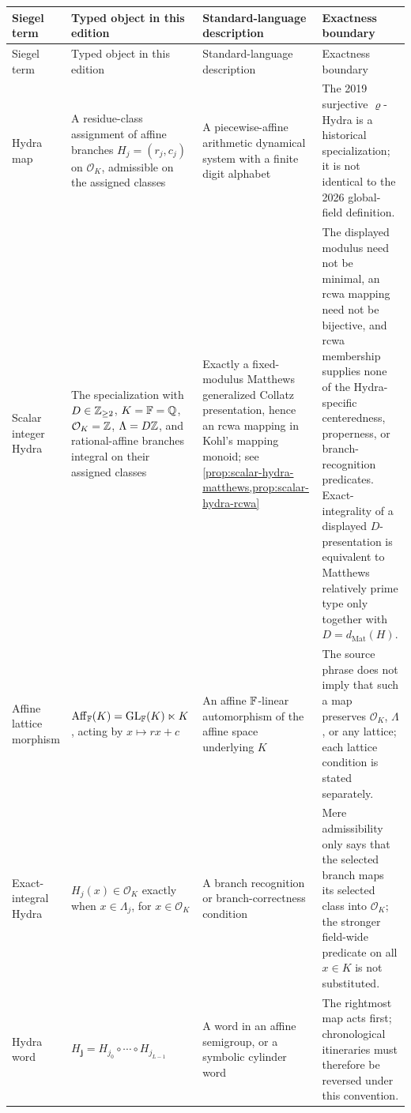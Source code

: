 \begingroup\small
\setlength{\tabcolsep}{3pt}
\begin{longtable}{@{}p{}p{}p{}p{}@{}}
\toprule
Siegel term & Typed object in this edition & Standard-language description & Exactness boundary\\
\midrule
\endfirsthead
\toprule
Siegel term & Typed object in this edition & Standard-language description & Exactness boundary\\
\midrule
\endhead
Hydra map & A residue-class assignment of affine branches
$H_j=(r_j,c_j)$ on $\mathcal O_K$, admissible on the assigned classes & A
piecewise-affine arithmetic dynamical system with a finite digit alphabet &
The 2019 surjective $\varrho$-Hydra is a historical specialization; it is not
identical to the 2026 global-field definition.\\

Scalar integer Hydra & The specialization with $D\in\mathbb Z_{\geq2}$,
$K=\mathbb F=\mathbb Q$, $\mathcal O_K=\mathbb Z$, $\Lambda=D\mathbb Z$, and rational-affine branches integral
on their assigned classes & Exactly a fixed-modulus Matthews generalized
Collatz presentation, hence an rcwa mapping in Kohl's mapping monoid; see
\cref{prop:scalar-hydra-matthews,prop:scalar-hydra-rcwa} & The displayed
modulus need not be minimal, an rcwa mapping need not be bijective, and rcwa
membership supplies none of the Hydra-specific centeredness, properness, or
branch-recognition predicates.  Exact-integrality of a displayed
$D$-presentation is equivalent to Matthews relatively prime type only together
with $D=d_{\mathrm{Mat}}(H)$.\\

Affine lattice morphism &
$\operatorname{Aff}_\mathbb F(K)=\operatorname{GL}_\mathbb F(K)\ltimes K$, acting by
$x\mapsto rx+c$ & An affine $\mathbb F$-linear automorphism of the affine space
underlying $K$ & The source phrase does not imply that such a map preserves
$\mathcal O_K$, $\Lambda$, or any lattice; each lattice condition is stated
separately.\\

Exact-integral Hydra &
$H_j(x)\in\mathcal O_K$ exactly when $x\in\Lambda_j$, for
$x\in\mathcal O_K$ & A branch recognition or branch-correctness condition &
Mere admissibility only says that the selected branch maps its selected class
into $\mathcal O_K$; the stronger field-wide predicate on all $x\in K$ is
not substituted.\\

Hydra word &
$H_{\mathbf j}=H_{j_0}\circ\cdots\circ H_{j_{L-1}}$ & A word in an affine
semigroup, or a symbolic cylinder word & The rightmost map acts first;
chronological itineraries must therefore be reversed under this convention.\\


\end{longtable}
